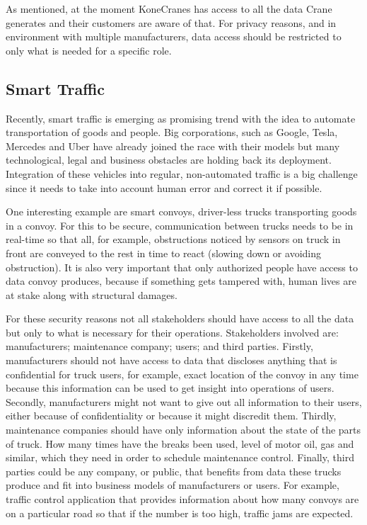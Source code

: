 As mentioned, at the moment KoneCranes has access to all the data Crane generates and their customers are aware
of that. For privacy reasons, and in environment with multiple manufacturers, data access should be restricted to only what is needed for a specific role. 

\subsection{Smart Traffic}

Recently, smart traffic is emerging as promising trend with the idea to automate transportation of goods and people. Big corporations, such as Google, Tesla, Mercedes and Uber have already joined the race with their models but many technological, legal and business obstacles are holding back its deployment. Integration of these vehicles into regular, non-automated traffic is a big challenge since it needs to take into account human error and correct it if possible.

One interesting example are smart convoys, driver-less trucks transporting goods in a convoy. For this to be secure, communication between trucks needs to be in real-time so that all, for example, obstructions noticed by sensors on truck in front are conveyed to the rest in time to react (slowing down or avoiding obstruction). It is also very important that only authorized people have access to data convoy produces, because if something gets tampered with, human lives are at stake along with structural damages. 

For these security reasons not all stakeholders should have access to all the data but only to what is necessary for their operations. Stakeholders involved are: manufacturers; maintenance company; users; and third parties. Firstly, manufacturers should not have access to data that discloses anything that is confidential for truck users, for example, exact location of the convoy in any time because this information can be used to get insight into operations of users. Secondly, manufacturers might not want to give out all information to their users, either because of confidentiality or because it might discredit them. Thirdly, maintenance companies should have only information about the state of the parts of truck. How many times have the breaks been used, level of motor oil, gas and similar, which they need in order to schedule maintenance control. Finally, third parties could be any company, or public, that benefits from data these trucks produce and fit into business models of manufacturers or users. For example, traffic control application that provides information about how many convoys are on a particular road so that if the number is too high, traffic jams are expected.

